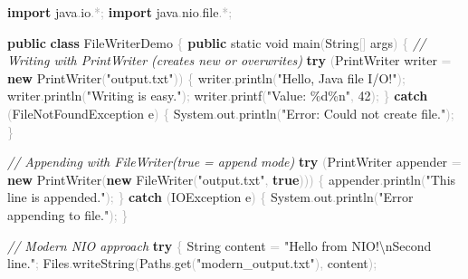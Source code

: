 \documentclass[
  justified,
  openright,
]{tufte-book}
\newcommand{\KeywordTok}[1]{\textcolor{CodeKeyword}{\textbf{#1}}}  %
\newcommand{\StringTok}[1]{\textcolor{CodeString}{#1}}              %
\newcommand{\CommentTok}[1]{\textcolor{CodeComment}{\textit{#1}}}  %
\newcommand{\CodeNumTok}[1]{\textcolor{CodeNumber}{#1}}             %
\newcommand{\CodeFuncTok}[1]{\textcolor{CodeKeyword}{#1}}           %
\newcommand{\CodeTypeTok}[1]{\textcolor{CodeType}{#1}}              %
\newcommand{\CodeAccentTok}[1]{\textcolor{CodeAccent}{#1}}          %
\newcommand{\OperatorTok}[1]{\textcolor{DarkGray}{#1}}              %
\newenvironment{Shaded}{%
  \begin{mdframed}[style=TufteCode]%
}{%
  \end{mdframed}%
}
\begin{document}
\begin{Shaded}
\begin{Highlighting}[]
\KeywordTok{import} \CodeAccentTok{java}\OperatorTok{.}\CodeAccentTok{io}\OperatorTok{.*;}
\KeywordTok{import} \CodeAccentTok{java}\OperatorTok{.}\CodeAccentTok{nio}\OperatorTok{.}\CodeAccentTok{file}\OperatorTok{.*;}
 
\KeywordTok{public} \KeywordTok{class} FileWriterDemo \OperatorTok{\{}
    \KeywordTok{public} \CodeTypeTok{static} \CodeTypeTok{void} \CodeFuncTok{main}\OperatorTok{(}String\OperatorTok{[]} args\OperatorTok{)} \OperatorTok{\{}
        \CommentTok{// Writing with PrintWriter (creates new or overwrites)}
        \KeywordTok{try} \OperatorTok{(}PrintWriter writer \OperatorTok{=} \KeywordTok{new} PrintWriter\OperatorTok{(}\StringTok{"output.txt"}\OperatorTok{))} \OperatorTok{\{}
            writer\OperatorTok{.}\CodeFuncTok{println}\OperatorTok{(}\StringTok{"Hello, Java file I/O!"}\OperatorTok{);}
            writer\OperatorTok{.}\CodeFuncTok{println}\OperatorTok{(}\StringTok{"Writing is easy."}\OperatorTok{);}
            writer\OperatorTok{.}\CodeFuncTok{printf}\OperatorTok{(}\StringTok{"Value: }\StringTok{\%d\%n}\StringTok{"}\OperatorTok{,} \CodeNumTok{42}\OperatorTok{);}
        \OperatorTok{\}} \KeywordTok{catch} \OperatorTok{(}FileNotFoundException e\OperatorTok{)} \OperatorTok{\{}
            System\OperatorTok{.}\CodeFuncTok{out}\OperatorTok{.}\CodeFuncTok{println}\OperatorTok{(}\StringTok{"Error: Could not create file."}\OperatorTok{);}
        \OperatorTok{\}}
 
        \CommentTok{// Appending with FileWriter(true = append mode)}
        \KeywordTok{try} \OperatorTok{(}PrintWriter appender \OperatorTok{=} \KeywordTok{new} PrintWriter\OperatorTok{(}\KeywordTok{new} FileWriter\OperatorTok{(}\StringTok{"output.txt"}\OperatorTok{,} \KeywordTok{true}\OperatorTok{)))} \OperatorTok{\{}
            appender\OperatorTok{.}\CodeFuncTok{println}\OperatorTok{(}\StringTok{"This line is appended."}\OperatorTok{);}
        \OperatorTok{\}} \KeywordTok{catch} \OperatorTok{(}IOException e\OperatorTok{)} \OperatorTok{\{}
            System\OperatorTok{.}\CodeFuncTok{out}\OperatorTok{.}\CodeFuncTok{println}\OperatorTok{(}\StringTok{"Error appending to file."}\OperatorTok{);}
        \OperatorTok{\}}
 
        \CommentTok{// Modern NIO approach}
        \KeywordTok{try} \OperatorTok{\{}
            String content \OperatorTok{=} \StringTok{"Hello from NIO!}\StringTok{\textbackslash{}n}\StringTok{Second line."}\OperatorTok{;}
            Files\OperatorTok{.}\CodeFuncTok{writeString}\OperatorTok{(}Paths\OperatorTok{.}\CodeFuncTok{get}\OperatorTok{(}\StringTok{"modern\_output.txt"}\OperatorTok{),} content\OperatorTok{);}
 

\end{Highlighting}
\end{Shaded}
\end{document}
